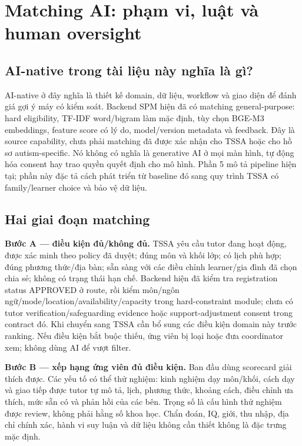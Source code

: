 \documentclass[11pt,a4paper]{article}
\begin{document}
\section{Matching AI: phạm vi, luật và human oversight}

\subsection{AI-native trong tài liệu này nghĩa là gì?}
AI-native ở đây nghĩa là thiết kế domain, dữ liệu, workflow và giao diện để đánh giá gợi ý máy có kiểm soát. Backend SPM hiện đã có matching general-purpose: hard eligibility, TF-IDF word/bigram làm mặc định, tùy chọn BGE-M3 embeddings, feature score có lý do, model/version metadata và feedback. Đây là source capability, chưa phải matching đã được xác nhận cho TSSA hoặc cho hồ sơ autism-specific. Nó không có nghĩa là generative AI ở mọi màn hình, tự động hóa consent hay trao quyền quyết định cho mô hình. Phần 5 mô tả pipeline hiện tại; phần này đặc tả cách phát triển từ baseline đó sang quy trình TSSA có family/learner choice và bảo vệ dữ liệu.

\subsection{Hai giai đoạn matching}
\textbf{Bước A — điều kiện đủ/không đủ.} TSSA yêu cầu tutor đang hoạt động, được xác minh theo policy đã duyệt; đúng môn và khối lớp; có lịch phù hợp; đúng phương thức/địa bàn; sẵn sàng với các điều chỉnh learner/gia đình đã chọn chia sẻ; không có trạng thái hạn chế. Backend hiện đã kiểm tra registration status APPROVED ở route, rồi kiểm môn/ngôn ngữ/mode/location/availability/capacity trong hard-constraint module; chưa có tutor verification/safeguarding evidence hoặc support-adjustment consent trong contract đó. Khi chuyển sang TSSA cần bổ sung các điều kiện domain này trước ranking. Nếu điều kiện bắt buộc thiếu, ứng viên bị loại hoặc đưa coordinator xem; không dùng AI để vượt filter.

\textbf{Bước B — xếp hạng ứng viên đủ điều kiện.} Ban đầu dùng scorecard giải thích được. Các yếu tố có thể thử nghiệm: kinh nghiệm dạy môn/khối, cách dạy và giao tiếp được tutor tự mô tả, lịch, phương thức, khoảng cách, điều chỉnh ưa thích, mức sẵn có và phản hồi của các bên. Trọng số là cấu hình thử nghiệm được review, không phải hằng số khoa học. Chẩn đoán, IQ, giới, thu nhập, địa chỉ chính xác, hành vi suy luận và dữ liệu không cần thiết không là đặc trưng mặc định.
\end{document}
